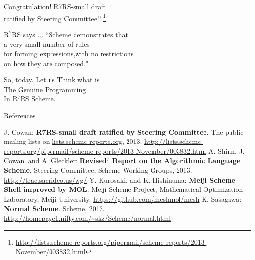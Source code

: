 \documentclass[dvipdfmx,12pt,fleqn]{beamer}
\begin{document}
\begin{frame}{Congratulation!}
\pause\Huge
R7RS-small draft\\
\alert{ratified} \Large{}by Steering Committee!!
\footnote{\url{http://lists.scheme-reports.org/pipermail/scheme-reports/2013-November/003832.html}}
\end{frame}

\begin{frame}{R$^7$RS says ...}
\Large
``Scheme demonstrates that\\
\pause \alert{a very small number of rules}\\
for forming expressions,\pause with no restrictions\\
\pause \alert{on how they are composed}."
\end{frame}

\begin{frame}{So, today.}
\huge
Let us Think what is\\
\alert{The Genuine Programming}\\
In R$^7$RS Scheme.
\end{frame}

\begin{frame}{References}
\footnotesize
\begin{thebibliography}{9}
\beamertemplatetextbibitems
{} J. Cowan: \textbf{R7RS-small draft ratified by Steering Committee}. The public mailing lists on \url{lists.scheme-reports.org}, 2013. \url{http://lists.scheme-reports.org/pipermail/scheme-reports/2013-November/003832.html}
 A. Shinn, J. Cowan, and A. Gleckler: \textbf{Revised$^7$ Report on the Algorithmic Language Scheme}. Steering Committee, Scheme Working Groups, 2013. \url{http://trac.sacrideo.us/wg/}
 Y. Kurosaki, and K. Hishinuma: \textbf{Meiji Scheme Shell improved by MOL}. Meiji Scheme Project, Mathematical Optimization Laboratory, Meiji University. \url{https://github.com/meshmol/mesh}
 K. Sasagawa: \textbf{Normal Scheme}. Scheme, 2013. \url{http://homepage1.nifty.com/~skz/Scheme/normal.html}
\end{thebibliography}
\end{frame}
\end{document}
